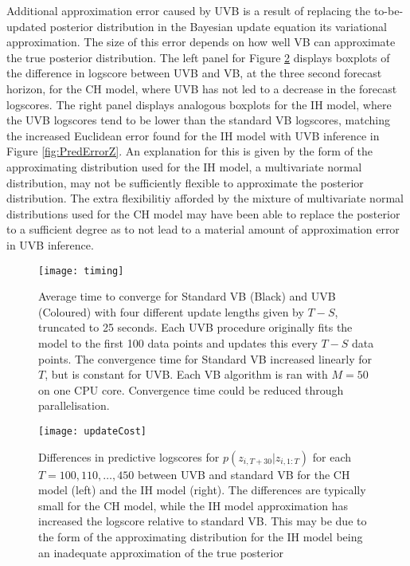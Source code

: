 \documentclass[12pt,a4paper]{article}\usepackage[]{graphicx}\usepackage[]{color}
\begin{document}
Additional approximation error caused by UVB is a result of replacing the to-be-updated posterior distribution in the Bayesian update equation its variational approximation. The size of this error depends on how well VB can approximate the true posterior distribution. The left panel for Figure \ref{fig:updateCost} displays boxplots of the difference in logscore between UVB and VB, at the three second forecast horizon, for the CH model, where UVB has not led to a decrease in the forecast logscores. The right panel displays analogous boxplots for the IH model, where the UVB logscores tend to be lower than the standard VB logscores, matching the increased Euclidean error found for the IH model with UVB inference in Figure \ref{fig:PredErrorZ}. An explanation for this is given by the form of the approximating distribution used for the IH model, a multivariate normal distribution, may not be sufficiently flexible to approximate the posterior distribution. The extra flexibilitiy afforded by the mixture of multivariate normal distributions used for the CH model may have been able to replace the posterior to a sufficient degree as to not lead to a material amount of approximation error in UVB inference.

\begin{figure}[htp]
\centering
\texttt{[image: timing]}
\caption{Average time to converge for Standard VB (Black) and UVB (Coloured) with four different update lengths given by $T - S$, truncated to 25 seconds. Each UVB procedure originally fits the model to the first 100 data points and updates this every $T - S$ data points. The convergence time for Standard VB increased linearly for $T$, but is constant for UVB. Each VB algorithm is ran with $M = 50$ on one CPU core. Convergence time could be reduced through parallelisation.}
\label{fig:timing}
\end{figure}
\begin{figure}[htp]
\centering
\texttt{[image: updateCost]}
\caption{Differences in predictive logscores for $p(z_{i, T+30} | z_{i, 1:T})$ for each $T = 100, 110, \dots, 450$ between UVB and standard VB for the CH model (left) and the IH model (right). The differences are typically small for the CH model, while the IH model approximation has increased the logscore relative to standard VB. This may be due to the form of the approximating distribution for the IH model being an inadequate approximation of the true posterior}
\label{fig:updateCost}
\end{figure}
\end{document}
